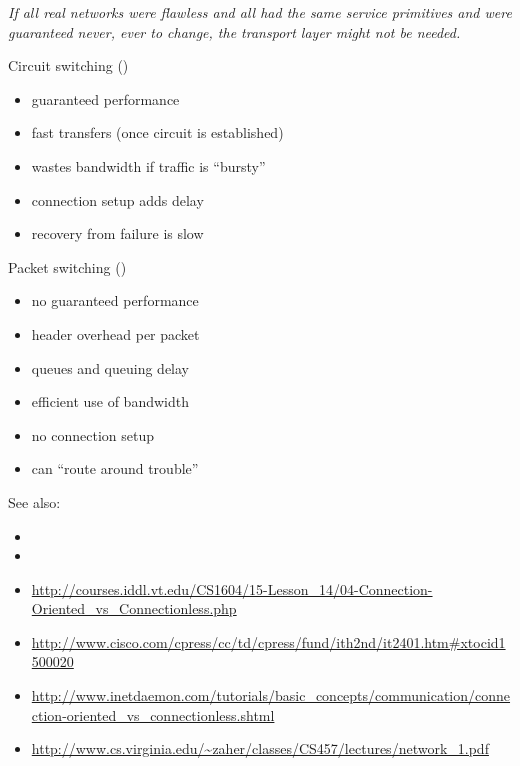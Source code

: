   \emph{If all real networks were flawless and all had the same service primitives and
    were guaranteed never, ever to change, the transport layer might not be needed.}

\begin{frame}{\quad {}\quad {}}
  \begin{minipage}[t]{.47\linewidth}
    \begin{block}{Circuit switching ()}
      \begin{itemize}
      \item[\good] guaranteed performance
      \item[\good] fast transfers (once circuit is established)
      \item[\textcolor{red}{\bad}] wastes bandwidth if traffic is ``bursty''
      \item[\textcolor{red}{\bad}] connection setup adds delay
      \item[\textcolor{red}{\bad}] recovery from failure is slow
      \end{itemize}
    \end{block}
  \end{minipage}\hfill
  \begin{minipage}[t]{.47\linewidth}
    \begin{block}{Packet switching ()}
      \begin{itemize}
      \item[\textcolor{red}{\bad}] no guaranteed performance
      \item[\textcolor{red}{\bad}] header overhead per packet
      \item[\textcolor{red}{\bad}] queues and queuing delay
      \item[\good] efficient use of bandwidth
      \item[\good] no connection setup
      \item[\good] can ``route around trouble''
      \end{itemize}
    \end{block}
  \end{minipage}
\end{frame}

See also:
\begin{itemize}
\item {}
\item {}
\item
  \url{http://courses.iddl.vt.edu/CS1604/15-Lesson_14/04-Connection-Oriented_vs_Connectionless.php}
\item \url{http://www.cisco.com/cpress/cc/td/cpress/fund/ith2nd/it2401.htm#xtocid1500020}
\item
  \url{http://www.inetdaemon.com/tutorials/basic_concepts/communication/connection-oriented_vs_connectionless.shtml}
\item \url{http://www.cs.virginia.edu/~zaher/classes/CS457/lectures/network_1.pdf}
\end{itemize}

